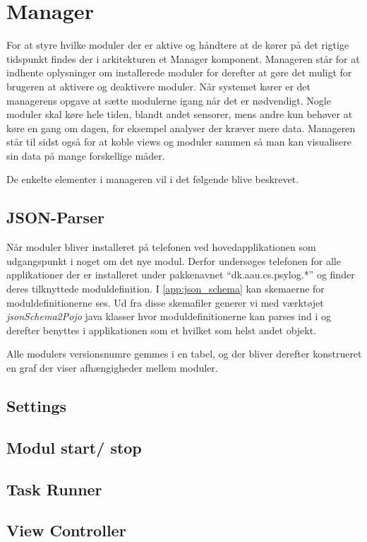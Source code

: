 \section{Manager}

For at styre hvilke moduler der er aktive og håndtere at de kører på det rigtige tidspunkt findes der i arkitekturen et Manager komponent.
Manageren står for at indhente oplysninger om installerede moduler for derefter at gøre det muligt for brugeren at aktivere og deaktivere moduler.
Når systemet kører er det managerens opgave at sætte modulerne igang når det er nødvendigt.
Nogle moduler skal køre hele tiden, blandt andet sensorer, mens andre kun behøver at køre en gang om dagen, for eksempel analyser der kræver mere data.
Manageren står til sidst også for at koble views og moduler sammen så man kan visualisere sin data på mange forskellige måder.

De enkelte elementer i manageren vil i det følgende blive beskrevet.

\subsection{JSON-Parser}

Når moduler bliver installeret på telefonen ved hovedapplikationen som udgangspunkt i noget om det nye modul.
Derfor undersøges telefonen for alle applikationer der er installeret under pakkenavnet ``dk.aau.cs.psylog.*'' og finder deres tilknyttede moduldefinition.
I \cref{app:json_schema} kan skemaerne for moduldefinitionerne ses.
Ud fra disse skemafiler generer vi med værktøjet \textit{jsonSchema2Pojo} \cite{jsonpojo} java klasser hvor moduldefinitionerne kan parses ind i og derefter benyttes i applikationen som et hvilket som helst andet objekt.


Alle modulers versionsnumre gemmes i en tabel, og der bliver derefter konstrueret en graf der viser afhængigheder mellem moduler.

\subsection{Settings}


\subsection{Modul start/ stop}

\subsection{Task Runner}

\subsection{View Controller}

